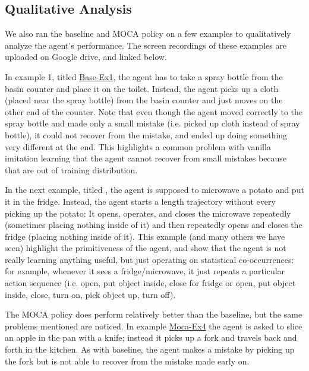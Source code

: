 \documentclass[11pt,a4paper]{article}
\begin{document}
\subsection{Qualitative Analysis}
We also ran the baseline and MOCA policy on a few examples to qualitatively analyze the agent's performance. The screen recordings of these examples are uploaded on Google drive, and linked below.

In example 1, titled \href{https://drive.google.com/file/d/1xXIIFGBwzP2QGCXlV4v_YlFTHf9C8228/view?usp=sharing}{Base-Ex1}, the agent has to take a spray bottle from the basin counter and place it on the toilet. Instead, the agent picks up a cloth (placed near the spray bottle) from the basin counter and just moves on the other end of the counter. Note that even though the agent moved correctly to the spray bottle and made only a small mistake (i.e. picked up cloth instead of spray bottle), it could not recover from the mistake, and ended up doing something very different at the end. This highlights a common problem with vanilla imitation learning that the agent cannot recover from small mistakes because that are out of training distribution.


In the next example, titled \href{https://drive.google.com/file/d/1A790sCe33eKV-MivCO2t5O2DD8Atlh2C/view?usp=sharing}, the agent is supposed to microwave a potato and put it in the fridge. Instead, the agent starts a length trajectory without every picking up the potato: It opens, operates, and closes the microwave repeatedly (sometimes placing nothing inside of it) and then repeatedly opens and closes the fridge (placing nothing inside of it). This example (and many others we have seen) highlight the primitiveness of the agent, and show that the agent is not really learning anything useful, but just operating on statistical co-occurrences: for example, whenever it sees a fridge/microwave, it just repeats a particular action sequence (i.e. open, put object inside, close for fridge or open, put object inside, close, turn on, pick object up, turn off).

The MOCA policy does perform relatively better than the baseline, but the same problems mentioned are noticed. In example \href{https://drive.google.com/file/d/16_FJ3689Mv5dxvu9pU1HZ96QvNm7fCc2/view?usp=sharing}{Moca-Ex4} the agent is asked to slice an apple in the pan with a knife; instead it picks up a fork and travels back and forth in the kitchen. As with baseline, the agent makes a mistake by picking up the fork but is not able to recover from the mistake made early on.
\end{document}
